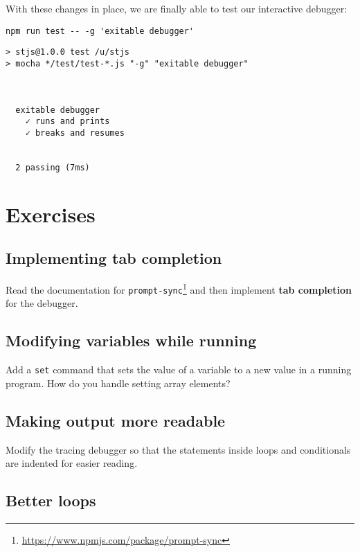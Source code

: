 \documentclass[krantzl]{krantz}
\newcommand{\glossref}[1]{\textbf{#1}}
\newcommand{\hreffoot}[2]{{#1}\footnote{\href{#2}{#2}}}
\begin{document}
With these changes in place,
we are finally able to test our interactive debugger:


\begin{lstlisting}[frame=single,frameround=tttt]
npm run test -- -g 'exitable debugger'
\end{lstlisting}



\begin{lstlisting}[frame=single,frameround=tttt]
> stjs@1.0.0 test /u/stjs
> mocha */test/test-*.js "-g" "exitable debugger"



  exitable debugger
    ✓ runs and prints
    ✓ breaks and resumes


  2 passing (7ms)
\end{lstlisting}



\section{Exercises}\label{debugger-exercises}

\subsection*{Implementing tab completion}


Read the documentation for \hreffoot{\texttt{prompt-sync}}{https://www.npmjs.com/package/prompt-sync}
and then implement \glossref{tab completion}
for the debugger.

\subsection*{Modifying variables while running}


Add a \texttt{set} command that sets the value of a variable to a new value in a running program.
How do you handle setting array elements?

\subsection*{Making output more readable}


Modify the tracing debugger so that
the statements inside loops and conditionals are indented for easier reading.

\subsection*{Better loops}
\end{document}
